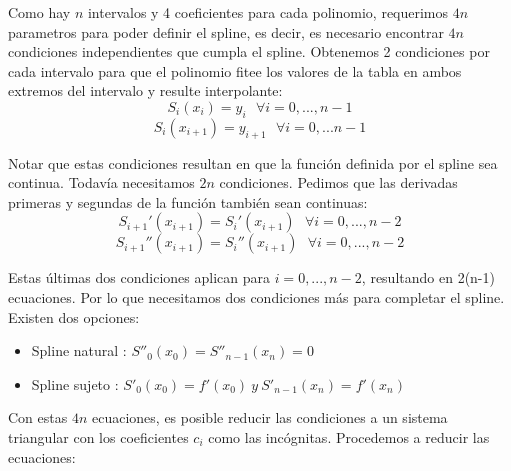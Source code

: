 \par Como hay $n$ intervalos y 4 coeficientes para cada polinomio, requerimos $4n$ parametros para poder definir el spline, es decir, es necesario encontrar $4n$ condiciones independientes que cumpla el spline. Obtenemos 2 condiciones por cada intervalo para que el polinomio fitee los valores de la tabla en ambos extremos del intervalo y resulte interpolante:
\begin{equation}\label{cond1}
S_i(x_i) = y_i  \ \ \ \forall i=0, ..., n-1 \tag{cond1}
\end{equation}
\begin{equation}\label{cond2}
S_i(x_{i+1}) = y_{i+1} \ \ \ \forall i=0,... n-1 \tag{cond2}
\end{equation}
\par Notar que estas condiciones resultan en que la función definida por el spline sea continua. Todavía necesitamos $2n$ condiciones. Pedimos que las derivadas primeras y segundas de la función también sean continuas:
\begin{equation}\label{cond3}
S_{i+1}'(x_{i+1}) = S_{i}'(x_{i+1}) \ \ \  \forall  i=0, ..., n-2 \tag{cond3}
\end{equation}
\begin{equation}\label{cond4}
S_{i+1}''(x_{i+1}) = S_{i}''(x_{i+1}) \ \ \  \forall i=0, ..., n-2 \tag{cond4}
\end{equation}
\par Estas últimas dos condiciones aplican para $i=0, ..., n-2$, resultando en 2(n-1) ecuaciones. Por lo que necesitamos dos condiciones más para completar el spline. Existen dos opciones:

\begin{itemize}
\item Spline natural : $S''_0(x_0) =  S''_{n-1}(x_n) = 0$
\item Spline sujeto : $S'_0(x_0) = f'(x_0)\ y\ S'_{n-1}(x_n) = f'(x_n) $
\end{itemize}

\par Con estas $4n$ ecuaciones, es posible reducir las condiciones a un sistema triangular con los coeficientes $c_i$ como las incógnitas. Procedemos a reducir las ecuaciones:




\setlength{\belowdisplayskip}{0pt} \setlength{\belowdisplayshortskip}{0pt}
\setlength{\abovedisplayskip}{0pt} \setlength{\abovedisplayshortskip}{0pt}

